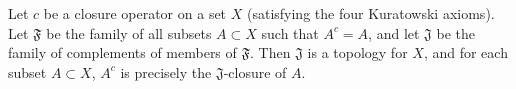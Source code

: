 Let $c$ be a closure operator on a set $X$ (satisfying the four Kuratowski axioms). Let $\mathfrak{F}$ be the family of all subsets $A \subset X$ such that $A^{c} = A$, and let $\mathfrak{J}$ be the family of complements of members of $\mathfrak{F}$. Then $\mathfrak{J}$ is a topology for $X$, and for each subset $A \subset X$, $A^{c}$ is precisely the $\mathfrak{J}$-closure of $A$.
